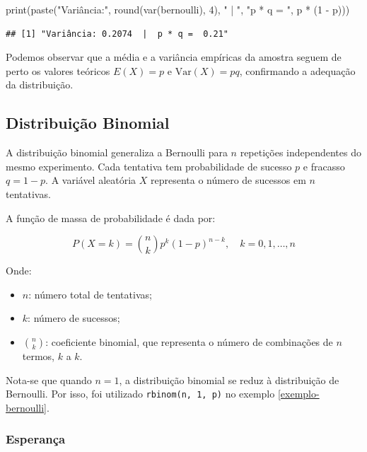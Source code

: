 \documentclass[
]{article}
\newenvironment{Shaded}{\begin{snugshade}}{\end{snugshade}}
\newcommand{\DecValTok}[1]{\textcolor[rgb]{0.00,0.00,0.81}{#1}}
\newcommand{\FunctionTok}[1]{\textcolor[rgb]{0.00,0.00,0.00}{#1}}
\newcommand{\NormalTok}[1]{#1}
\newcommand{\SpecialCharTok}[1]{\textcolor[rgb]{0.00,0.00,0.00}{#1}}
\newcommand{\StringTok}[1]{\textcolor[rgb]{0.31,0.60,0.02}{#1}}
\begin{document}
\begin{Shaded}
\begin{Highlighting}[]
\FunctionTok{print}\NormalTok{(}\FunctionTok{paste}\NormalTok{(}\StringTok{"Variância:"}\NormalTok{, }\FunctionTok{round}\NormalTok{(}\FunctionTok{var}\NormalTok{(bernoulli), }\DecValTok{4}\NormalTok{), }\StringTok{" | "}\NormalTok{, }\StringTok{"p * q = "}\NormalTok{, p }\SpecialCharTok{*}\NormalTok{ (}\DecValTok{1} \SpecialCharTok{{-}}\NormalTok{ p)))}
\end{Highlighting}
\end{Shaded}

\begin{verbatim}
## [1] "Variância: 0.2074  |  p * q =  0.21"
\end{verbatim}

Podemos observar que a média e a variância empíricas da amostra seguem de perto os valores teóricos \(E(X) = p\) e \(\text{Var}(X) = pq\), confirmando a adequação da distribuição.

\hypertarget{distribuiuxe7uxe3o-binomial}{%
\subsection{Distribuição Binomial}\label{distribuiuxe7uxe3o-binomial}}

A distribuição binomial generaliza a Bernoulli para \(n\) repetições independentes do mesmo experimento. Cada tentativa tem probabilidade de sucesso \(p\) e fracasso \(q = 1 - p\). A variável aleatória \(X\) representa o número de sucessos em \(n\) tentativas.

A função de massa de probabilidade é dada por:

\[
P(X = k) = \binom{n}{k} p^k (1 - p)^{n - k}, \quad k = 0, 1, \ldots, n
\]

Onde:

\begin{itemize}
  \item $n$: número total de tentativas;
  \item $k$: número de sucessos;
  \item $\binom{n}{k}$: coeficiente binomial, que representa o número de combinações de $n$ termos, $k$ a $k$.
\end{itemize}

Nota-se que quando \(n = 1\), a distribuição binomial se reduz à distribuição de Bernoulli. Por isso, foi utilizado \texttt{rbinom(n,\ 1,\ p)} no exemplo \ref{exemplo-bernoulli}.

\hypertarget{esperanuxe7a-1}{%
\subsubsection{Esperança}\label{esperanuxe7a-1}}
\end{document}
